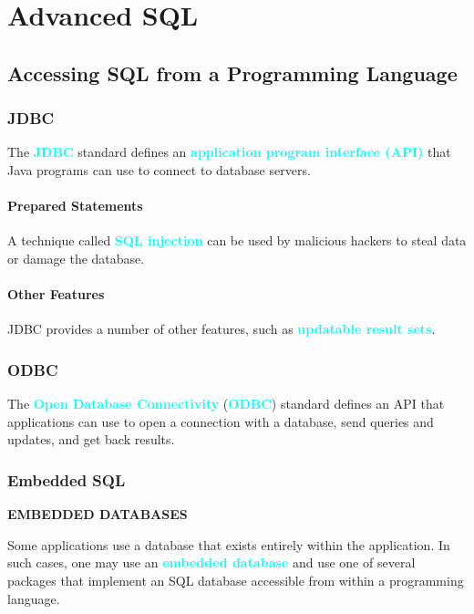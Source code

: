\documentclass[a4paper,12pt,twoside,openany]{book}
\newcommand{\textcy}[1]{\textbf{\textcolor{cyan}{#1}}}
\begin{document}
\chapter{Advanced SQL}
\section{Accessing SQL from a Programming Language}
\subsection{JDBC}

The \textcy{JDBC} standard defines an \textcy{application program interface (API)} that Java programs can use to connect to database servers.

\subsubsection{Prepared Statements}

A technique called \textcy{SQL injection} can be used by malicious hackers to steal data or damage the database.

\subsubsection{Other Features}

JDBC provides a number of other features, such as \textcy{updatable result sets}.

\subsection{ODBC}

The \textcy{Open Database Connectivity} (\textcy{ODBC}) standard defines an API that applications can use to open a connection with a database, send queries and updates, and get back results.

\subsection{Embedded SQL}

\begin{framed}
    \begin{center}
        {\textbf{EMBEDDED DATABASES}}
    \end{center}

    Some applications use a database that exists entirely within the application. In such cases, one may use an \textcy{embedded database} and use one of several packages that implement an SQL database accessible from within a programming language.

\end{framed}
\end{document}
